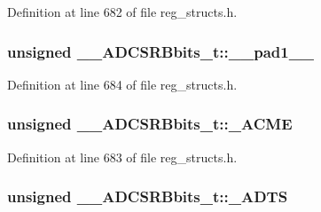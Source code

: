 Definition at line 682 of file reg\+\_\+structs.\+h.

\hypertarget{union_____a_d_c_s_r_bbits__t_ab26eaaa87a5eb5c5e30ac606395a2502}{
\subsubsection[{\+\_\+\+\_\+pad1\+\_\+\+\_\+}]{\setlength{\rightskip}{0pt plus 5cm}unsigned \+\_\+\+\_\+\+A\+D\+C\+S\+R\+Bbits\+\_\+t\+::\+\_\+\+\_\+pad1\+\_\+\+\_\+}}\label{union_____a_d_c_s_r_bbits__t_ab26eaaa87a5eb5c5e30ac606395a2502}


Definition at line 684 of file reg\+\_\+structs.\+h.

\hypertarget{union_____a_d_c_s_r_bbits__t_acf30e407b6de285ce1b4529f5621a5b0}{
\subsubsection[{\+\_\+\+A\+C\+M\+E}]{\setlength{\rightskip}{0pt plus 5cm}unsigned \+\_\+\+\_\+\+A\+D\+C\+S\+R\+Bbits\+\_\+t\+::\+\_\+\+A\+C\+M\+E}}\label{union_____a_d_c_s_r_bbits__t_acf30e407b6de285ce1b4529f5621a5b0}


Definition at line 683 of file reg\+\_\+structs.\+h.

\hypertarget{union_____a_d_c_s_r_bbits__t_a831946aed8a0315a3951fb1321399736}{
\subsubsection[{\+\_\+\+A\+D\+T\+S}]{\setlength{\rightskip}{0pt plus 5cm}unsigned \+\_\+\+\_\+\+A\+D\+C\+S\+R\+Bbits\+\_\+t\+::\+\_\+\+A\+D\+T\+S}}\label{union_____a_d_c_s_r_bbits__t_a831946aed8a0315a3951fb1321399736}


